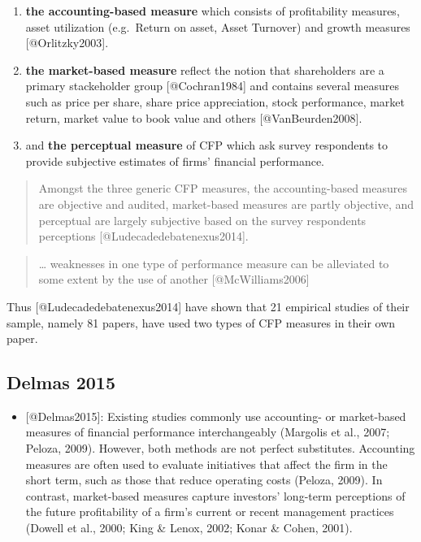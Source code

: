 \documentclass[]{article}
\providecommand{\tightlist}{%
  \setlength{\itemsep}{0pt}\setlength{\parskip}{0pt}}
\begin{document}
\begin{enumerate}
\def\labelenumi{\arabic{enumi}.}
\item
  \textbf{the accounting-based measure} which consists of profitability
  measures, asset utilization (e.g.~Return on asset, Asset Turnover) and
  growth measures {[}@Orlitzky2003{]}.
\item
  \textbf{the market-based measure} reflect the notion that shareholders
  are a primary stackeholder group {[}@Cochran1984{]} and contains
  several measures such as price per share, share price appreciation,
  stock performance, market return, market value to book value and
  others {[}@VanBeurden2008{]}.
\item
  and \textbf{the perceptual measure} of CFP which ask survey
  respondents to provide subjective estimates of firms' financial
  performance.
\end{enumerate}

\begin{quote}
Amongst the three generic CFP measures, the accounting-based measures
are objective and audited, market-based measures are partly objective,
and perceptual are largely subjective based on the survey respondents
perceptions {[}@Ludecadedebatenexus2014{]}.
\end{quote}

\begin{quote}
\ldots{} weaknesses in one type of performance measure can be alleviated
to some extent by the use of another {[}@McWilliams2006{]}
\end{quote}

Thus {[}@Ludecadedebatenexus2014{]} have shown that 21 empirical studies
of their sample, namely 81 papers, have used two types of CFP measures
in their own paper.

\subsection{Delmas 2015}\label{delmas-2015}

\begin{itemize}
\tightlist
\item
  {[}@Delmas2015{]}: Existing studies commonly use accounting- or
  market-based measures of financial performance interchangeably
  (Margolis et al., 2007; Peloza, 2009). However, both methods are not
  perfect substitutes. Accounting measures are often used to evaluate
  initiatives that affect the firm in the short term, such as those that
  reduce operating costs (Peloza, 2009). In contrast, market-based
  measures capture investors' long-term perceptions of the future
  profitability of a firm's current or recent management practices
  (Dowell et al., 2000; King \& Lenox, 2002; Konar \& Cohen, 2001).
\end{itemize}
\end{document}
